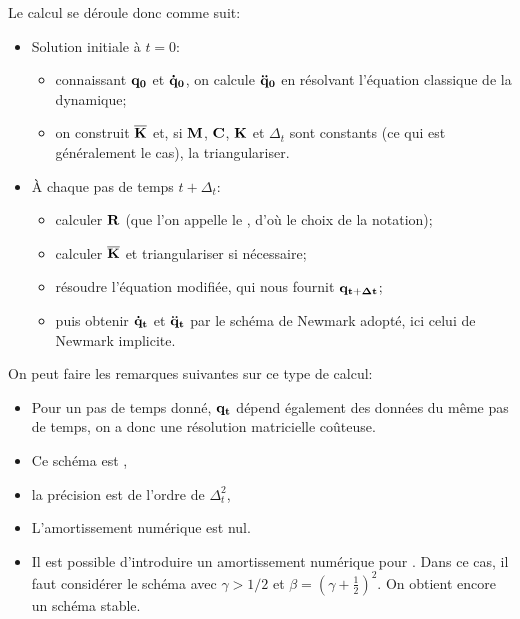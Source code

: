 \medskip
Le calcul se déroule donc comme suit:
\begin{itemize}
   \item Solution initiale à $t=0$:
	\begin{itemize}
	\item connaissant $\mathbf{q_0}$ et $\mathbf{\dot q_0}$, on calcule $\mathbf{\ddot q_0}$ en résolvant
	l'équation \og classique\fg{} de la dynamique;
	\item on construit $\mathbf{\overline{K}}$ et, si $\mathbf{M}$, $\mathbf{C}$, $\mathbf{K}$ et $\Delta_t$ sont constants
	(ce qui est généralement le cas), la triangulariser.
	\end{itemize}
   \item À chaque pas de temps $t+\Delta_t$:
	\begin{itemize}
	\item calculer $\mathbf{R}$ (que l'on appelle le , d'où le choix de la notation);
	\item calculer $\mathbf{\overline{K}}$ et triangulariser si nécessaire;
	\item résoudre l'équation modifiée, qui nous fournit $\mathbf{q_{t+\Delta t}}$;
	\item puis obtenir $\mathbf{\dot q_t}$ et $\mathbf{\ddot q_t}$ par le schéma de Newmark adopté,
	ici celui de Newmark implicite.
	\end{itemize}
\end{itemize}

\medskip
On peut faire les remarques suivantes sur ce type de calcul:
\begin{itemize}
   \item Pour un pas de temps donné, $\mathbf{q_t}$ dépend également des données du même pas de temps,
	on a donc une résolution matricielle coûteuse.
   \item Ce schéma est , 
   \item la précision est de l'ordre de $\Delta_t^2$, 
   \item L'amortissement numérique est nul.
   \item Il est possible d'introduire un amortissement numérique pour . Dans ce cas, il faut considérer le schéma avec $\gamma>1/2$ et
	$\beta=(\gamma+\frac12)^2$. On obtient encore un schéma stable.
\end{itemize}




